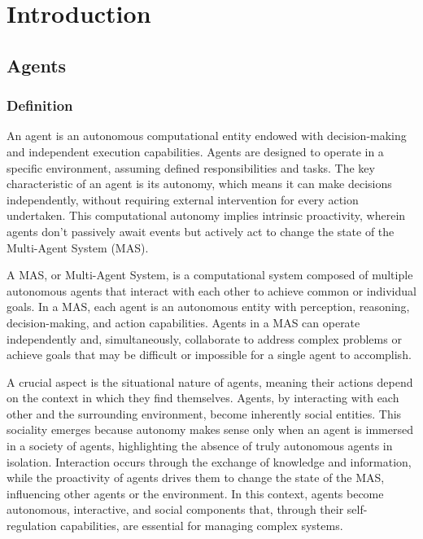 \section{Introduction}

\subsection{Agents}

\subsubsection{Definition}
An agent is an autonomous computational entity endowed with decision-making and independent execution capabilities. Agents are designed to operate in a specific environment, assuming defined responsibilities and tasks. The key characteristic of an agent is its autonomy, which means it can make decisions independently, without requiring external intervention for every action undertaken. This computational autonomy implies intrinsic proactivity, wherein agents don't passively await events but actively act to change the state of the Multi-Agent System (MAS).

A MAS, or Multi-Agent System, is a computational system composed of multiple autonomous agents that interact with each other to achieve common or individual goals. In a MAS, each agent is an autonomous entity with perception, reasoning, decision-making, and action capabilities. Agents in a MAS can operate independently and, simultaneously, collaborate to address complex problems or achieve goals that may be difficult or impossible for a single agent to accomplish.

A crucial aspect is the situational nature of agents, meaning their actions depend on the context in which they find themselves. Agents, by interacting with each other and the surrounding environment, become inherently social entities. This sociality emerges because autonomy makes sense only when an agent is immersed in a society of agents, highlighting the absence of truly autonomous agents in isolation. Interaction occurs through the exchange of knowledge and information, while the proactivity of agents drives them to change the state of the MAS, influencing other agents or the environment. In this context, agents become autonomous, interactive, and social components that, through their self-regulation capabilities, are essential for managing complex systems.

